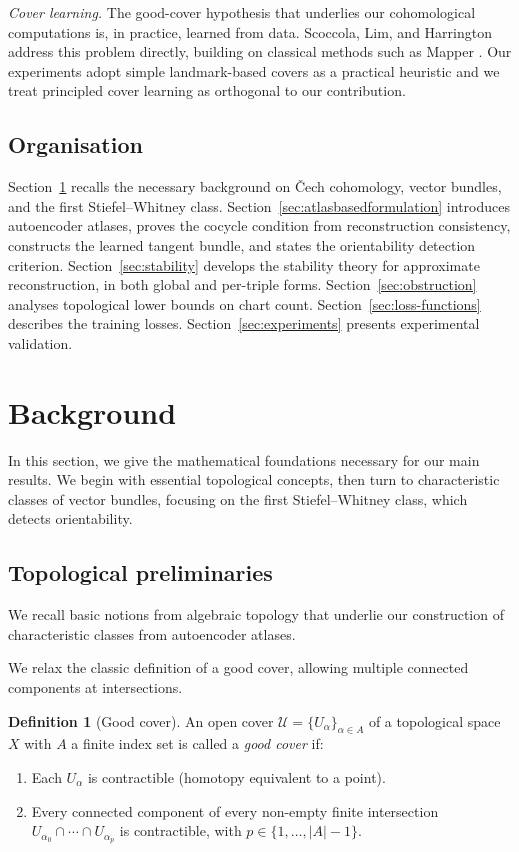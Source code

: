 \documentclass[11pt]{article}
\theoremstyle{plain}
\theoremstyle{definition}
\newtheorem{definition}[theorem]{Definition}
\theoremstyle{remark}
\begin{document}
\emph{Cover learning.}
The good-cover hypothesis that underlies our cohomological computations is, in practice, learned from data. Scoccola, Lim, and Harrington \cite{scoccola2025coverlearninglargescaletopology} address this problem directly, building on classical methods such as Mapper \cite{singhMC07,doi:10.1137/24M1641312}. Our experiments adopt simple landmark-based covers as a practical heuristic and we treat principled cover learning as orthogonal to our contribution.

\subsection*{Organisation}

Section~\ref{sec:background} recalls the necessary background on \v{C}ech cohomology, vector bundles, and the first Stiefel--Whitney class. Section~\ref{sec:atlasbasedformulation} introduces autoencoder atlases, proves the cocycle condition from reconstruction consistency, constructs the learned tangent bundle, and states the orientability detection criterion. Section~\ref{sec:stability} develops the stability theory for approximate reconstruction, in both global and per-triple forms. Section~\ref{sec:obstruction} analyses topological lower bounds on chart count. Section~\ref{sec:loss-functions} describes the training losses. Section~\ref{sec:experiments} presents experimental validation.


\section{Background}\label{sec:background}
In this section, we give the mathematical foundations necessary for our main results. 
We begin with essential topological concepts, then turn to characteristic classes of vector bundles, focusing on the first Stiefel--Whitney class, which detects orientability.
 
\subsection{Topological preliminaries}
 
We recall basic notions from algebraic topology that underlie our construction of characteristic classes from autoencoder atlases.
 
We relax the classic definition of a good cover, allowing multiple connected components at intersections. 
\begin{definition}[Good cover]\label{def:good-cover}
An open cover $\mathcal{U} = \{U_\alpha\}_{\alpha\in A}$ of a topological space $X$ with $A$ a finite index set is called a \emph{good cover} if:
\begin{enumerate}
\item Each $U_\alpha$ is contractible (homotopy equivalent to a point).
\item Every connected component of every non-empty finite intersection $U_{\alpha_0} \cap \cdots \cap U_{\alpha_p}$ is contractible, with $p\in\{1,\dots,\vert A\vert-1\}$. 
\end{enumerate}
\end{definition} 
 
\end{document}
